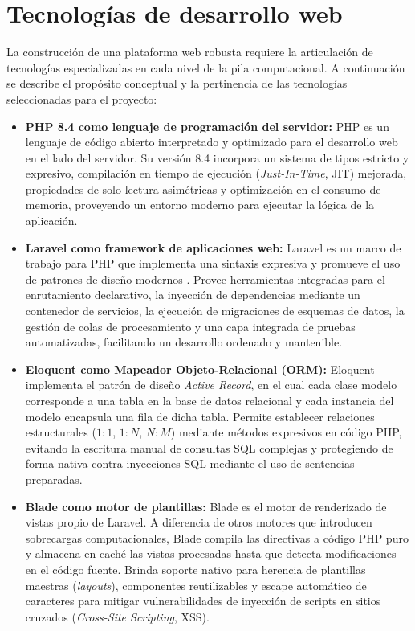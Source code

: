 \section{Tecnologías de desarrollo web}

La construcción de una plataforma web robusta requiere la articulación de tecnologías especializadas en cada nivel de la pila computacional. A continuación se describe el propósito conceptual y la pertinencia de las tecnologías seleccionadas para el proyecto:

\begin{itemize}
    \item \textbf{PHP 8.4 como lenguaje de programación del servidor:} PHP es un lenguaje de código abierto interpretado y optimizado para el desarrollo web en el lado del servidor. Su versión 8.4 incorpora un sistema de tipos estricto y expresivo, compilación en tiempo de ejecución (\textit{Just-In-Time}, JIT) mejorada, propiedades de solo lectura asimétricas y optimización en el consumo de memoria, proveyendo un entorno moderno para ejecutar la lógica de la aplicación.
    \item \textbf{Laravel como framework de aplicaciones web:} Laravel es un marco de trabajo para PHP que implementa una sintaxis expresiva y promueve el uso de patrones de diseño modernos \cite{laravel2026docs}. Provee herramientas integradas para el enrutamiento declarativo, la inyección de dependencias mediante un contenedor de servicios, la ejecución de migraciones de esquemas de datos, la gestión de colas de procesamiento y una capa integrada de pruebas automatizadas, facilitando un desarrollo ordenado y mantenible.
    \item \textbf{Eloquent como Mapeador Objeto-Relacional (ORM):} Eloquent implementa el patrón de diseño \textit{Active Record}, en el cual cada clase modelo corresponde a una tabla en la base de datos relacional y cada instancia del modelo encapsula una fila de dicha tabla. Permite establecer relaciones estructurales ($1:1$, $1:N$, $N:M$) mediante métodos expresivos en código PHP, evitando la escritura manual de consultas SQL complejas y protegiendo de forma nativa contra inyecciones SQL mediante el uso de sentencias preparadas.
    \item \textbf{Blade como motor de plantillas:} Blade es el motor de renderizado de vistas propio de Laravel. A diferencia de otros motores que introducen sobrecargas computacionales, Blade compila las directivas a código PHP puro y almacena en caché las vistas procesadas hasta que detecta modificaciones en el código fuente. Brinda soporte nativo para herencia de plantillas maestras (\textit{layouts}), componentes reutilizables y escape automático de caracteres para mitigar vulnerabilidades de inyección de scripts en sitios cruzados (\textit{Cross-Site Scripting}, XSS).

\end{itemize}
